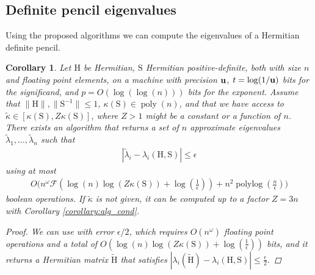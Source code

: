 \documentclass{article}
\newcommand{\labs}{\left|}
\newcommand{\rabs}{\right|}
\newtheorem{corollary}{Corollary}[section]
\DeclareMathOperator{\poly}{poly}
\DeclareMathOperator{\polylog}{polylog}
\newcommand\matH{\boldsymbol{\mathrm{H}}}
\newcommand\matS{\boldsymbol{\mathrm{S}}}
\newcommand\matHtilde{\widetilde{\boldsymbol{\mathrm{H}}}}
\newcommand{\umach}{\textbf{\textup{u}}}
\newcommand{\flopcost}{\mathcal{F}}
\begin{document}
\subsection{Definite pencil eigenvalues}
Using the proposed algorithms we can compute the eigenvalues of a Hermitian definite pencil.
\begin{corollary}
    \label{corollary:hermitian_definite_pencil_eigenvalues}
    Let $\matH$ be Hermitian, $\matS$ Hermitian positive-definite, both with size $n$ and floating point elements, on a machine with precision $\umach$, $t=\log(1/\umach)$ bits for the significand, and $p=O(\log(\log(n)))$ bits for the exponent. Assume that $\|\matH\|,\|\matS^{-1}\|\leq 1$, $\kappa(\matS)\in\poly(n)$, and that we have access to $\widetilde\kappa\in[\kappa(\matS),Z\kappa(\matS)]$, where $Z>1$ might be a constant or a function of $n$. There exists an algorithm that returns a set of $n$ approximate eigenvalues $\widetilde\lambda_1,\ldots,\widetilde\lambda_n$ such that
    \begin{align*}
        \labs \widetilde\lambda_i - \lambda_i(\matH,\matS) \rabs
        \leq
        \epsilon
    \end{align*}
    using at most 
    \begin{align*}
        O\Big(
            n^{\omega}
            \flopcost(\log(n)\log(Z\kappa(\matS)) + \log(\tfrac{1}{\epsilon}))
            +
            n^2\polylog(\tfrac{n}{\epsilon})
        \Big)
    \end{align*}
    boolean operations. If $\widetilde\kappa$ is not given, it can be computed up to a factor $Z=3n$ with Corollary \ref{corollary:alg_cond}.
    \begin{proof}
         We can use \cite[Prop. C.3]{sobczyk2024invariant} with error $\epsilon/2$, which requires $O(n^{\omega})$ floating point operations and a total of $O(\log(n)\log(Z\kappa(\matS))+\log(\tfrac{1}{\epsilon}))$ bits, and it returns a Hermitian matrix $\matHtilde$ that satisfies
         $|\lambda_i(\matHtilde)-\lambda_i(\matH,\matS)|\leq \tfrac{\epsilon}{2}$.


\end{proof}
\end{corollary}
\end{document}
